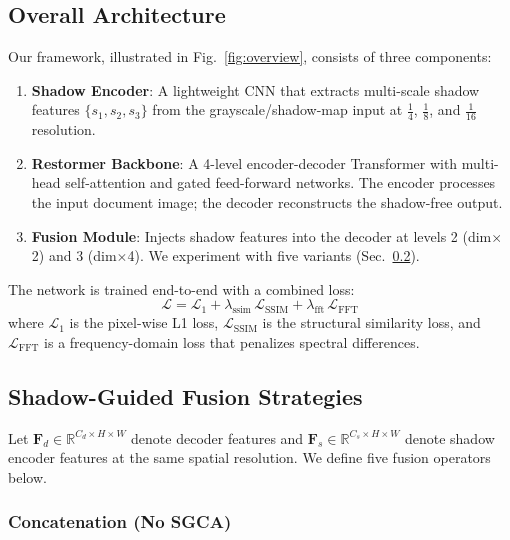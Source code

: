 \documentclass[11pt]{article}
\begin{document}
\subsection{Overall Architecture}
\label{sec:arch}

Our framework, illustrated in Fig.~\ref{fig:overview}, consists of three components:

\begin{enumerate}
  \item \textbf{Shadow Encoder}: A lightweight CNN that extracts multi-scale shadow features $\{s_1, s_2, s_3\}$ from the grayscale/shadow-map input at $\frac{1}{4}$, $\frac{1}{8}$, and $\frac{1}{16}$ resolution.
  \item \textbf{Restormer Backbone}: A 4-level encoder-decoder Transformer with multi-head self-attention and gated feed-forward networks. The encoder processes the input document image; the decoder reconstructs the shadow-free output.
  \item \textbf{Fusion Module}: Injects shadow features into the decoder at levels 2 (dim$\times$2) and 3 (dim$\times$4). We experiment with five variants (Sec.~\ref{sec:fusion}).
\end{enumerate}

The network is trained end-to-end with a combined loss:
\begin{equation}
  \mathcal{L} = \mathcal{L}_1 + \lambda_{\text{ssim}}\,\mathcal{L}_{\text{SSIM}} + \lambda_{\text{fft}}\,\mathcal{L}_{\text{FFT}}
\end{equation}
where $\mathcal{L}_1$ is the pixel-wise L1 loss, $\mathcal{L}_{\text{SSIM}}$ is the structural similarity loss, and $\mathcal{L}_{\text{FFT}}$ is a frequency-domain loss that penalizes spectral differences.

\subsection{Shadow-Guided Fusion Strategies}
\label{sec:fusion}

Let $\mathbf{F}_d \in \mathbb{R}^{C_d \times H \times W}$ denote decoder features and $\mathbf{F}_s \in \mathbb{R}^{C_s \times H \times W}$ denote shadow encoder features at the same spatial resolution.
We define five fusion operators below.

\subsubsection{Concatenation (No SGCA)}
\end{document}
